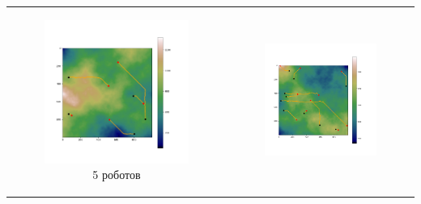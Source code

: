 \documentclass{article}
\begin{document}
	\begin{table}[H]
		\begin{tabular}{c c}
			\begin{subfigure}{0.5\linewidth}
				\includegraphics[width = 1.0\columnwidth]{data/mean_paths/1000x1000/5.png}
			\caption*{5 роботов}
			\end{subfigure}
			&
			\begin{subfigure}{0.5\linewidth}
				\includegraphics[width = 1.0\columnwidth]{data/mean_paths/1000x1000/10.png}

\end{subfigure}
\end{tabular}
\end{table}
\end{document}
